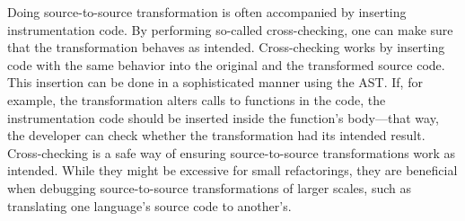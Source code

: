 Doing source-to-source transformation is often accompanied by 
inserting instrumentation code. 
By performing so-called cross-checking, one can make sure that 
the transformation behaves as intended. 
Cross-checking works by inserting code with the same behavior 
into the original and the transformed source code.  
This insertion can be done in a sophisticated manner using the AST. 
If, for example, the transformation alters calls to functions 
in the code, the instrumentation code should be inserted inside the 
function's body—that way, the developer can check whether 
the transformation had its intended result.
Cross-checking is a safe way of ensuring source-to-source 
transformations work as intended. 
While they might be excessive for small refactorings, 
they are beneficial when debugging source-to-source 
transformations of larger scales, such as translating 
one language's source code to another's.
